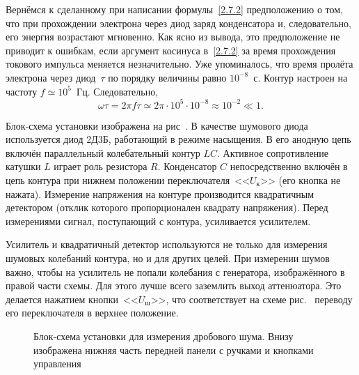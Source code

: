 Вернёмся к сделанному при написании формулы~\eqref{2.7.2} предположению о том,
что при прохождении электрона через диод заряд конденсатора и, следовательно, 
его энергия возрастают мгновенно. Как ясно из вывода, это предположение 
не приводит к ошибкам, если аргумент косинуса в~\eqref{2.7.2} за время 
прохождения токового импульса меняется незначительно. Уже упоминалось, 
что время пролёта электрона через диод~$\tau$ по порядку величины
равно $10^{-8}$~с. Контур настроен на частоту $f\simeq10^5$~Гц. Следовательно,
\begin{equation*}
\omega\tau=2\pi f\tau\simeq2\pi\cdot 10^5\cdot 10^{-8}\approx10^{-2}\ll1.
\end{equation*}

\experiment
Блок-схема установки изображена на рис~. В качестве
шумового диода используется диод 2Д3Б, работающий в
режиме насыщения. В его анодную цепь включён параллельный колебательный контур
$LC$. Активное сопротивление катушки $L$
играет роль резистора $R$. Конденсатор $C$ непосредственно включён в цепь
контура при нижнем положении
переключателя~<<$U_{\text{к}}$>> (его кнопка не нажата). Измерение напряжения на
контуре производится квадратичным детектором
(отклик которого пропорционален квадрату напряжения).
Перед измерениями сигнал, поступающий с контура, усиливается усилителем.

Усилитель и квадратичный детектор используются не только для измерения шумовых
колебаний контура, но и для других целей.
При измерении шумов важно, чтобы на усилитель не попали колебания с генератора,
изображённого в правой части схемы. Для этого лучше всего заземлить выход аттенюатора. 
Это делается нажатием кнопки~<<$U_{\text{ш}}$>>, что соответствует на схеме
рис.~ переводу его переключателя в верхнее положение.

\begin{figure}[h!]
    \centering\small
	\caption{Блок-схема установки для измерения дробового шума. Внизу изображена
нижняя часть передней панели с ручками и кнопками управления}
\end{figure}

